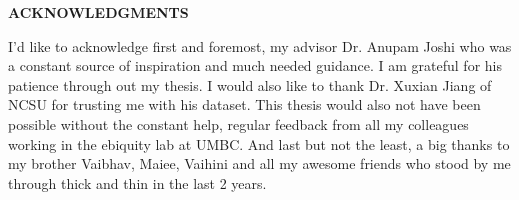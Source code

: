 \newpage
\pagestyle{empty}

\begin{center}
\vspace{0.1in}
\large{\bf ACKNOWLEDGMENTS} \par  
\bigskip \bigskip
\end{center}

\thispagestyle{plain}
I{\rq}d like to acknowledge first and foremost, my advisor Dr. Anupam Joshi who was a constant source of inspiration and much needed guidance. I am grateful for his patience through out my thesis. I would also like to thank Dr. Xuxian Jiang of NCSU for trusting me with his dataset. This thesis would also not have been possible without the constant help, regular feedback from all my colleagues working in the ebiquity lab at UMBC. And last but not the least, a big thanks to my brother Vaibhav, Maiee, Vaihini and all my awesome friends who stood by me through thick and thin in the last 2 years.